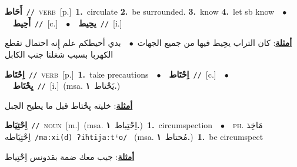 \documentclass[10pt,a4paper,twoside]{article} %
\begin{document}
\begin{multicols}{2}
{\setlength\topsep{0pt}\textbf{\foreignlanguage{arabic}{أَحَاط}}\ {\color{gray}\texttt{//}\color{black}}\ \textsc{verb}\ [p.]\ \textbf{1.}~circulate  \textbf{2.}~be surrounded.  \textbf{3.}~know  \textbf{4.}~let sb know\ \ $\bullet$\ \ \setlength\topsep{0pt}\textbf{\foreignlanguage{arabic}{أَحِيط}}\ {\color{gray}\texttt{//}\color{black}}\ [c.]\ \ $\bullet$\ \ \setlength\topsep{0pt}\textbf{\foreignlanguage{arabic}{يحِيط}}\ {\color{gray}\texttt{//}\color{black}}\ [i.]\  \begin{flushright}\color{gray}\foreignlanguage{arabic}{\textbf{\underline{\foreignlanguage{arabic}{أمثلة}}}: كان التراب يحِيط فيها من جميع الجهات\ $\bullet$\ \  بدي أحيطكم علم إِنه احتمال تقطع الكهربا بسبب شغلنا جنب الكابل}\end{flushright}\color{black}} \vspace{2mm}

{\setlength\topsep{0pt}\textbf{\foreignlanguage{arabic}{اِحْتَاط}}\ {\color{gray}\texttt{//}\color{black}}\ \textsc{verb}\ [p.]\ \textbf{1.}~take precautions\ \ $\bullet$\ \ \setlength\topsep{0pt}\textbf{\foreignlanguage{arabic}{اِحْتَاط}}\ {\color{gray}\texttt{//}\color{black}}\ [c.]\ \ $\bullet$\ \ \setlength\topsep{0pt}\textbf{\foreignlanguage{arabic}{يِحْتَاط}}\ {\color{gray}\texttt{//}\color{black}}\ [i.]\ \color{gray}(msa. \foreignlanguage{arabic}{يَحْتاط}~\foreignlanguage{arabic}{\textbf{١.}})\color{black}\  \begin{flushright}\color{gray}\foreignlanguage{arabic}{\textbf{\underline{\foreignlanguage{arabic}{أمثلة}}}: خليته يِحْتاط قبل ما يطيح الجبل}\end{flushright}\color{black}} \vspace{2mm}

{\setlength\topsep{0pt}\textbf{\foreignlanguage{arabic}{اِحْتِيَاط}}\ {\color{gray}\texttt{//}\color{black}}\ \textsc{noun}\ [m.]\ \color{gray}(msa. \foreignlanguage{arabic}{اِحْتِياط}~\foreignlanguage{arabic}{\textbf{١.}})\color{black}\ \textbf{1.}~circumspection\ \ $\bullet$\ \ \textsc{ph.} \color{gray} \foreignlanguage{arabic}{مَاخِذ اِحْتِيَاطه}\color{black}\ {\color{gray}\texttt{/{\sffamily maːxi(d) ʔiħtijaːtˤo}/}\color{black}}\ \color{gray} (msa. \foreignlanguage{arabic}{مُحتاط}~\foreignlanguage{arabic}{\textbf{١.}})\color{black}\ \textbf{1.}~be circumspect\  \begin{flushright}\color{gray}\foreignlanguage{arabic}{\textbf{\underline{\foreignlanguage{arabic}{أمثلة}}}: جيب معك ضمة بقدونس اِحْتِياط}\end{flushright}\color{black}} \vspace{2mm}


\end{multicols}
\end{document}
